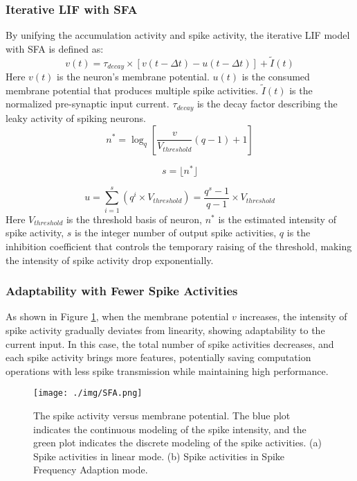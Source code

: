 \documentclass{article}
\begin{document}
\subsubsection{Iterative LIF with SFA}
By unifying the accumulation activity and spike activity, the iterative LIF model with SFA is defined as:
\begin{equation}
     v(t) = \tau_{decay} \times \left\lbrack v\left( {t - \Delta t} \right) - u\left( t - \Delta t \right) \right\rbrack  + \tilde{I}(t)
    \label{eq:SFA}
\end{equation}
Here $v(t)$ is the neuron's membrane potential. $u(t)$ is the consumed membrane potential that produces multiple spike activities. $\tilde{I}(t)$ is the normalized pre-synaptic input current. $\tau_{decay}$ is the decay factor describing the leaky activity of spiking neurons.
\begin{equation}
    n^{*} = {\log_{q}\left\lbrack \frac{v}{V_{threshold}}\left( {q - 1} \right) + 1 \right\rbrack}
\end{equation}

\begin{equation}
    s =  \lfloor n^{*} \rfloor
\end{equation}

\begin{equation}
    u = \sum_{i=1}^{s}{(q^{i}\times V_{threshold})}
    = \frac{q^{s} - 1}{q - 1} \times V_{threshold}
\end{equation}
Here $V_{threshold}$ is the threshold basis  of neuron, $n^*$ is the estimated intensity of spike activity, $s$ is the integer number of output spike activities, $q$ is the inhibition coefficient that controls the temporary raising of the threshold, making the intensity of spike activity drop exponentially. 

\subsubsection{Adaptability with Fewer Spike Activities}
As shown in Figure \ref{fig:s_curve}, when the membrane potential $v$ increases, the intensity of spike activity gradually deviates from linearity, showing adaptability to the current input. In this case, the total number of spike activities decreases, and each spike activity brings more features, potentially saving computation operations with less spike transmission while maintaining high performance.




\begin{figure}[htbp]
    \centering
\texttt{[image: ./img/SFA.png]}
    \caption{The spike activity versus membrane potential. The blue plot indicates the continuous modeling of the spike intensity, and the green plot indicates the discrete modeling of the spike activities. (a) Spike activities in linear mode. (b) Spike activities in Spike Frequency Adaption mode.}
    \label{fig:s_curve}
\end{figure}
\end{document}
